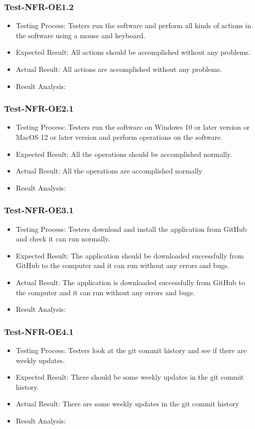 \documentclass[12pt, titlepage]{article}
\begin{document}
\subsubsection{Test-NFR-OE1.2}
\begin{itemize}
    \item Testing Process: Testers run the software and perform all kinds of actions in the software using a mouse and keyboard.
    \item Expected Result: All actions should be accomplished without any problems.
    \item Actual Result: All actions are accomplished without any problems.
    \item Result Analysis: \pass
\end{itemize}
\subsubsection{Test-NFR-OE2.1}
\begin{itemize}
    \item Testing Process: Testers run the software on Windows 10 or later version or MacOS 12 or later version and perform operations on the software.
    \item Expected Result: All the operations should be accomplished normally.
    \item Actual Result: All the operations are accomplished normally
    \item Result Analysis: \pass
\end{itemize}
\subsubsection{Test-NFR-OE3.1}
\begin{itemize}
    \item Testing Process: Testers download and install the application from GitHub and check it can run normally.
    \item Expected Result: The application should be downloaded successfully from GitHub to the computer and it can run without any errors and bugs.
    \item Actual Result: The application is downloaded successfully from GitHub to the computer and it can run without any errors and bugs.
    \item Result Analysis: \pass
\end{itemize}
\subsubsection{Test-NFR-OE4.1}
\begin{itemize}
    \item Testing Process: Testers look at the git commit history and see if there are weekly updates.
    \item Expected Result: There should be some weekly updates in the git commit history.
    \item Actual Result: There are some weekly updates in the git commit history
    \item Result Analysis: \pass
\end{itemize}
\end{document}
